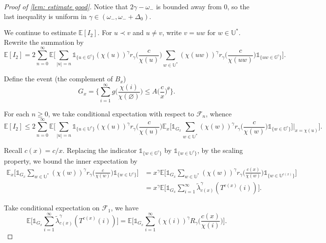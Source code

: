 \documentclass[10pt,a4paper]{amsart}
\begin{document}
\begin{proof}[Proof of \cref{lem: estimate good}]
\noindent Notice that $2\gamma-\omega_-$ is bounded away from $0$, so the last inequality is uniform in $\gamma\in(\omega_-, \omega_-+\Delta_0)$.

We continue to estimate $\mathbb{E}[I_2]$. For $u\prec v$ and $u\ne v$, write $v = uw$ for $w\in \mathbb{U}^*$. Rewrite the summation by
\[
\mathbb{E}[I_2] = 2\sum^{\infty}_{n=0}\mathbb{E}\bigg[\sum_{|u|=n}\mathds{1}_{\{u\in\mathbb{G}^c\}} (\chi(u))^{\gamma}r_{\gamma}\Big(\frac{c}{\chi(u)}\Big)\sum_{w\in\mathbb{U}^*} (\chi(uw))^{\gamma}r_{\gamma}\Big(\frac{c}{\chi(uw)}\Big)\mathds{1}_{\{uw\in\mathbb{G}^c\}}\bigg].
\]

\noindent Define the event (the complement of $B_x$)
\begin{equation}\label{eq: def G_x}
    G_x = \bigg\{\sum^{\infty}_{i=1} g\Big(\frac{\chi(i)}{\chi(\varnothing)}\Big)\leq A\Big(\frac{c}{x}\Big)^{\theta} \bigg\}.
\end{equation}

\noindent For each $n\geq 0$, we take conditional expectation with respect to $\mathcal{F}_n$, whence
\begin{equation}\label{eq: proof good I2 1}
\mathbb{E}[I_2] \le 2\sum^{\infty}_{n=0}\mathbb{E}\bigg[\sum_{|u|=n}\mathds{1}_{\{u\in\mathbb{U}^c\}} (\chi(u))^{\gamma}r_{\gamma}\Big(\frac{c}{\chi(u)}\Big)\mathbb{E}_x\Big[\mathds{1}_{G_x}\sum_{w\in\mathbb{U}^*} (\chi(w))^{\gamma}r_{\gamma}\Big(\frac{c}{\chi(w)}\Big)\mathds{1}_{\{w\in\mathbb{G}^{c}\}}\Big]\bigg|_{x=\chi(u)}\bigg].
\end{equation}

\noindent Recall $c(x)=c/x$. Replacing the indicator $\mathds{1}_{\{w\in\mathbb{G}^c\}}$ by $\mathds{1}_{\{w\in\mathbb{U}^c\}}$, by the scaling property, we bound the inner expectation by
\begin{align}  \mathbb{E}_x\bigg[\mathds{1}_{G_x}\sum_{w\in\mathbb{U}^*} (\chi(w))^{\gamma}r_{\gamma}\Big(\frac{c}{\chi(w)}\Big) \mathds{1}_{\{w\in\mathbb{U}^c\}}\bigg] &=x^{\gamma}\mathbb{E}\bigg[\mathds{1}_{G_x}\sum_{w\in\mathbb{U}^*} (\chi(w))^{\gamma}r_{\gamma}\Big(\frac{c(x)}{\chi(w)}\Big)\mathds{1}_{\{w\in\mathbb{U}^{c(x)}\}}\bigg]\nonumber \\
&=x^{\gamma}\mathbb{E}\bigg[\mathds{1}_{G_x}\sum^{\infty}_{i=1} \tilde{\lambda}^{\gamma}_{c(x)}(T^{c(x)}(i))\bigg]. \label{eq: proof good I2 2}
\end{align}

\noindent Take conditional expectation on $\mathcal{F}_1$,  we have
\[\mathbb{E}\bigg[\mathds{1}_{G_x}\sum^{\infty}_{i=1} \tilde{\lambda}^{\gamma}_{c(x)}(T^{c(x)}(i))\bigg] = \mathbb{E}\bigg[\mathds{1}_{G_x}\sum^{\infty}_{i=1} (\chi(i))^{\gamma}R_{\gamma}\Big(\frac{c(x)}{\chi(i)}\Big)\bigg]. \]


\end{proof}
\end{document}
